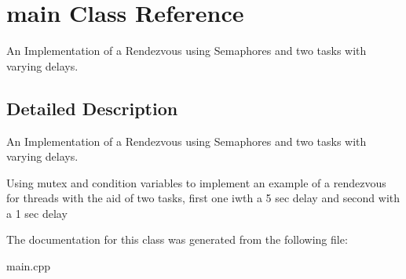 \hypertarget{classmain}{}\section{main Class Reference}
\label{classmain}


An Implementation of a Rendezvous using Semaphores and two tasks with varying delays.  




\subsection{Detailed Description}
An Implementation of a Rendezvous using Semaphores and two tasks with varying delays. 

Using mutex and condition variables to implement an example of a rendezvous for threads with the aid of two tasks, first one iwth a 5 sec delay and second with a 1 sec delay 

The documentation for this class was generated from the following file\+:\begin{DoxyCompactItemize}
\item 
main.\+cpp\end{DoxyCompactItemize}
